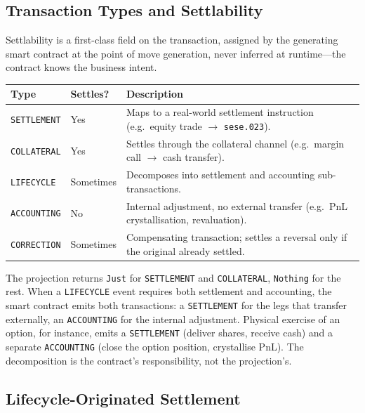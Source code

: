 \subsection{Transaction Types and Settlability}
\label{sec:settlement-types}

Settlability is a first-class field on the transaction, assigned by the generating smart contract at the point of move generation, never inferred at runtime---the contract knows the business intent.

\begin{center}
\begin{tabular}{l l p{7.5cm}}
\toprule
\textbf{Type} & \textbf{Settles?} & \textbf{Description} \\
\midrule
\texttt{SETTLEMENT} & Yes & Maps to a real-world settlement instruction (e.g.\ equity trade $\to$ \texttt{sese.023}). \\
\texttt{COLLATERAL} & Yes & Settles through the collateral channel (e.g.\ margin call $\to$ cash transfer). \\
\texttt{LIFECYCLE} & Sometimes & Decomposes into settlement and accounting sub-transactions. \\
\texttt{ACCOUNTING} & No & Internal adjustment, no external transfer (e.g.\ PnL crystallisation, revaluation). \\
\texttt{CORRECTION} & Sometimes & Compensating transaction; settles a reversal only if the original already settled. \\
\bottomrule
\end{tabular}
\end{center}

The projection returns \texttt{Just} for \texttt{SETTLEMENT} and \texttt{COLLATERAL}, \texttt{Nothing} for the rest. When a \texttt{LIFECYCLE} event requires both settlement and accounting, the smart contract emits both transactions: a \texttt{SETTLEMENT} for the legs that transfer externally, an \texttt{ACCOUNTING} for the internal adjustment. Physical exercise of an option, for instance, emits a \texttt{SETTLEMENT} (deliver shares, receive cash) and a separate \texttt{ACCOUNTING} (close the option position, crystallise PnL). The decomposition is the contract's responsibility, not the projection's.

\subsection{Lifecycle-Originated Settlement}
\label{sec:settlement-lifecycle}

